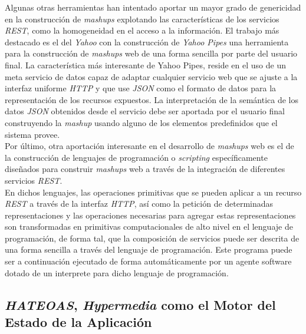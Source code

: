 Algunas otras herramientas han intentado aportar un mayor grado de genericidad en la construcci\'on de \textit{mashups} explotando las caracter\'isticas de los servicios \textit{REST}, como la homogeneidad en el acceso a la informaci\'on. El trabajo m\'as destacado es el del \textit{Yahoo} con la construcci\'on de \textit{Yahoo Pipes} \cite{yahoo_pipes} una herramienta para la construcci\'on de \textit{mashups} web de una forma sencilla por parte del usuario final. La caracter\'istica m\'as interesante de Yahoo Pipes, reside en el uso de un meta servicio de datos capaz de adaptar cualquier servicio web que se ajuste a la interfaz uniforme \textit{HTTP} y que use \textit{JSON} como el formato de datos para la representaci\'on de los recursos expuestos. La interpretaci\'on de la sem\'antica de los datos \textit{JSON} obtenidos desde el servicio debe ser aportada por el usuario final construyendo la \textit{mashup} usando alguno de los elementos predefinidos que el sistema provee.\\
Por \'ultimo, otra aportaci\'on interesante en el desarrollo de \textit{mashups} web es el de la construcci\'on de lenguajes de programaci\'on o \textit{scripting} \cite{sabbouh2007web} espec\'ificamente dise\~nados para construir \textit{mashups} web a trav\'es de la integraci\'on de diferentes servicios \textit{REST}.\\
En dichos lenguajes, las operaciones primitivas que se pueden aplicar a un recurso \textit{REST} a trav\'es de la interfaz \textit{HTTP}, as\'i como la petici\'on de determinadas representaciones y las operaciones necesarias para agregar estas representaciones son transformadas en primitivas computacionales de alto nivel en el lenguaje de programaci\'on, de forma tal, que la composici\'on de servicios puede ser descrita de una forma sencilla a trav\'es del lenguaje de programaci\'on. Este programa puede ser a continuaci\'on ejecutado de forma autom\'aticamente por un agente software dotado de un interprete para dicho lenguaje de programaci\'on.\\

\subsection{\textit{HATEOAS}, \textit{Hypermedia} como el Motor del Estado de la Aplicaci\'on}

